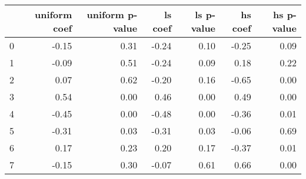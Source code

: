\begin{tabular}{lrrrrrr}
\toprule
 & uniform coef & uniform p-value & ls coef & ls p-value & hs coef & hs p-value \\
\midrule
0 & -0.15 & 0.31 & -0.24 & 0.10 & -0.25 & 0.09 \\
1 & -0.09 & 0.51 & -0.24 & 0.09 & 0.18 & 0.22 \\
2 & 0.07 & 0.62 & -0.20 & 0.16 & -0.65 & 0.00 \\
3 & 0.54 & 0.00 & 0.46 & 0.00 & 0.49 & 0.00 \\
4 & -0.45 & 0.00 & -0.48 & 0.00 & -0.36 & 0.01 \\
5 & -0.31 & 0.03 & -0.31 & 0.03 & -0.06 & 0.69 \\
6 & 0.17 & 0.23 & 0.20 & 0.17 & -0.37 & 0.01 \\
7 & -0.15 & 0.30 & -0.07 & 0.61 & 0.66 & 0.00 \\
\bottomrule
\end{tabular}

